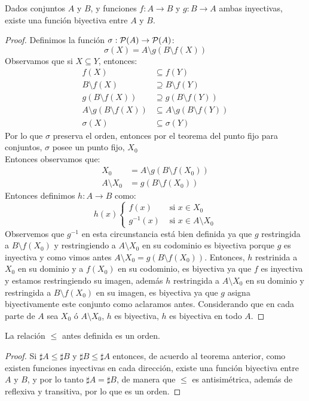 \documentclass[12pt,a4paper]{book}
\begin{document}
\begin{teo}
Dados conjuntos $A$ y $B$, y funciones $f: A \rightarrow B$ y $g:B \rightarrow A$ ambas inyectivas, existe una función biyectiva entre $A$ y $B$.
\begin{proof}
Definimos la función $ \sigma: \P(A) \rightarrow \P(A)$:
$$ \sigma(X) = A \setminus g(B \setminus f(X))$$
Observamos que si $X \subseteq Y$, entonces: 
\begin{align*}
f(X) &\subseteq f(Y) \\
B \setminus f(X) &\supseteq B \setminus f(Y) \\
g(B \setminus f(X)) &\supseteq g( B \setminus f(Y))\\
A \setminus g(B \setminus f(X)) &\subseteq A \setminus g( B \setminus f(Y))\\
\sigma(X) &\subseteq \sigma(Y)
\end{align*}
Por lo que $\sigma$ preserva el orden, entonces por el teorema del punto fijo para conjuntos, $\sigma$ posee un punto fijo, $X_0$\\
Entonces observamos que:
\begin{align*}
X_0 &= A \setminus g(B \setminus f(X_0))\\
A \setminus X_0 &= g(B \setminus f(X_0))
\end{align*}
Entonces definimos $h: A \rightarrow B$ como:
$$ h(x)
\begin{cases}
f(x) &\mbox{  si } x \in X_0 \\
g^{-1}(x) &\mbox{  si } x \in A \setminus X_0
\end{cases}
$$
Observemos que $g^{-1}$ en esta circunstancia está bien definida ya que $g$ restringida a $B \setminus f(X_0)$ y restringiendo a $A \setminus X_0$ en su codominio es biyectiva porque $g$ es inyectiva y como vimos antes $A \setminus X_0 = g(B \setminus f(X_0))$. 
Entonces, $h$ restrinida a $X_0$ en su dominio y a $f(X_0)$ en su codominio, es biyectiva ya que $f$ es inyectiva y estamos restringiendo su imagen, además $h$ restringida a $A \setminus X_0$ en su dominio y restringida a $B \setminus f(X_0)$ en su imagen, es biyectiva ya que $g$ asigna biyectivamente este conjunto como aclaramos antes. Considerando que en cada parte de $A$ sea  $X_0$ ó $A \setminus X_0$, $h$ es biyectiva, $h$ es biyectiva en todo $A$.
\end{proof}
\end{teo}
\begin{cor} La relación $\leq$ antes definida es un orden.
\begin{proof} Si $\sharp A \leq \sharp B$ y $\sharp B \leq \sharp A$ entonces, de acuerdo al teorema anterior, como existen funciones inyectivas en cada dirección, existe una función biyectiva entre $A$ y $B$, y por lo tanto $\sharp A = \sharp B$, de manera que $\leq$ es antisimétrica, además de reflexiva y transitiva, por lo que es un orden.
\end{proof}
\end{cor}
\end{document}
